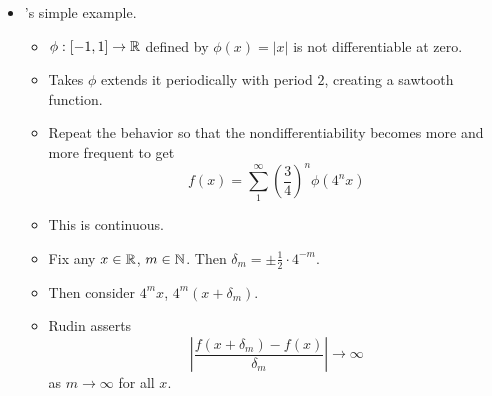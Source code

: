 \documentclass[../../notes.tex]{subfiles}
\begin{document}
\begin{itemize}
\begin{itemize}
\begin{itemize}
        \end{itemize}
    \end{itemize}
    \item \textcite{bib:Rudin}'s simple example.
    \begin{itemize}
        \item $\phi:[-1,1]\to\mathbb{R}$ defined by $\phi(x)=|x|$ is not differentiable at zero.
        \item Takes $\phi$ extends it periodically with period $2$, creating a sawtooth function.
        \item Repeat the behavior so that the nondifferentiability becomes more and more frequent to get
        \begin{equation*}
            f(x) = \sum_1^\infty\left( \frac{3}{4} \right)^n\phi(4^nx)
        \end{equation*}
        \item This is continuous.
        \item Fix any $x\in\mathbb{R}$, $m\in\mathbb{N}$. Then $\delta_m=\pm\frac{1}{2}\cdot 4^{-m}$.
        \item Then consider $4^mx$, $4^m(x+\delta_m)$.
        \item Rudin asserts
        \begin{equation*}
            \left| \frac{f(x+\delta_m)-f(x)}{\delta_m} \right| \to\infty
        \end{equation*}
        as $m\to\infty$ for all $x$.
    \end{itemize}
\end{itemize}
\end{document}
